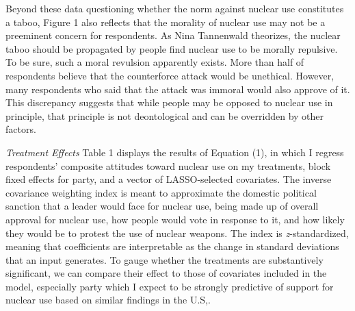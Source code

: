 \documentclass[12pt]{article}
\begin{document}
Beyond these data questioning whether the norm against nuclear use constitutes a taboo, Figure 1 also reflects that the morality of nuclear use may not be a preeminent concern for respondents. As Nina Tannenwald theorizes, the nuclear taboo should be propagated by people find nuclear use to be morally repulsive. To be sure, such a moral revulsion apparently exists. More than half of respondents believe that the counterforce attack would be unethical. However, many respondents who said that the attack was immoral would also approve of it. This discrepancy suggests that while people may be opposed to nuclear use in principle, that principle is not deontological and can be overridden by other factors.

\textit{Treatment Effects} Table 1 displays the results of Equation (1), in which I regress respondents' composite attitudes toward nuclear use on my treatments, block fixed effects for party, and a vector of LASSO-selected covariates. The inverse covariance weighting index is meant to approximate the domestic political sanction that a leader would face for nuclear use, being made up of overall approval for nuclear use, how people would vote in response to it, and how likely they would be to protest the use of nuclear weapons. The index is \textit{z}-standardized, meaning that coefficients are interpretable as the change in standard deviations that an input generates. To gauge whether the treatments are substantively significant, we can compare their effect to those of covariates included in the model, especially party which I expect to be strongly predictive of support for nuclear use based on similar findings in the U.S,.
\end{document}
